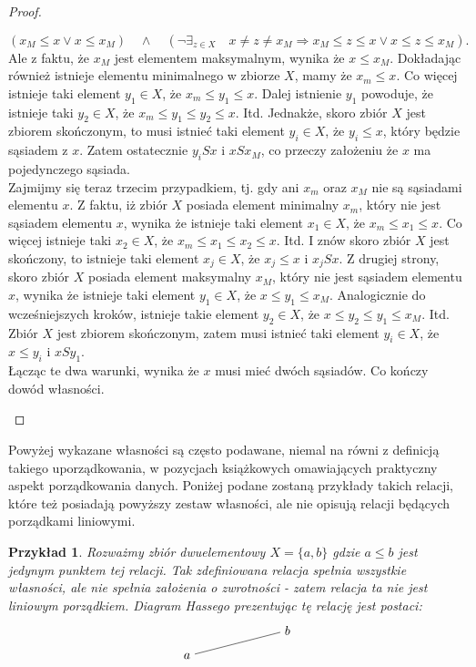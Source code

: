 \documentclass[12pt,a4paper]{report}
\newtheorem{example}{Przykład}
\begin{document}
\begin{proof}
\begin{enumerate}
\begin{itemize}
$$
\left(x_M \leq x \lor x \leq x_M\right) \quad \land \quad \left(\lnot \exists_{z \in X}  \quad x\neq z \neq x_M \Rightarrow   x_M \leq z \leq x \lor x \leq z \leq x_M \right). 
$$
Ale z faktu, że $x_M$ jest elementem maksymalnym, wynika że $x \leq x_M$. Dokładając również istnieje elementu minimalnego w zbiorze $X$, mamy że $x_m \leq x$. Co więcej istnieje taki element $y_1 \in X$, że $x_m \leq y_1 \leq x$. Dalej istnienie $y_1$ powoduje, że istnieje taki $y_2 \in X$, że $x_m \leq y_1 \leq y_2 \leq x$. Itd.  Jednakże, skoro zbiór $X$ jest zbiorem skończonym, to musi istnieć taki element $y_i \in X$, że $y_i \leq x$, który będzie sąsiadem z $x$. Zatem ostatecznie $y_iSx$ i $xSx_M$, co przeczy założeniu że $x$ ma pojedynczego sąsiada.\\
\newline
Zajmijmy się teraz trzecim przypadkiem, tj. gdy ani $x_m$ oraz $x_M$ nie są sąsiadami elementu $x$. Z faktu, iż zbiór $X$ posiada element minimalny $x_m$, który nie jest sąsiadem elementu $x$, wynika że istnieje taki element $x_1 \in X$, że $x_m \leq x_1 \leq x$. Co więcej istnieje taki $x_2 \in X$, że $x_m \leq x_1 \leq x_2 \leq x.$ Itd. I znów skoro zbiór $X$ jest skończony, to istnieje taki element $x_j \in X$, że $x_j \leq x$ i $x_jSx$. Z drugiej strony, skoro zbiór $X$ posiada element maksymalny $x_M$, który nie jest sąsiadem elementu $x$, wynika że istnieje taki element $y_1 \in X$, że $x \leq y_1 \leq x_M$. Analogicznie do wcześniejszych kroków, istnieje takie element $y_2 \in X$, że $x \leq y_2 \leq y_1 \leq x_M$. Itd.  Zbiór $X$ jest zbiorem skończonym, zatem musi istnieć taki element $y_i \in X$, że $x \leq y_i$ i $xSy_1$. \\
Łącząc te dwa warunki, wynika że $x$ musi mieć dwóch sąsiadów. Co kończy dowód własności.

\end{itemize}

\end{enumerate}
\end{proof}

Powyżej wykazane własności są często podawane, niemal na równi z definicją takiego uporządkowania, w pozycjach książkowych omawiających praktyczny aspekt porządkowania danych. Poniżej podane zostaną przykłady takich relacji, które też posiadają powyższy zestaw własności, ale nie opisują relacji będących porządkami liniowymi. 
 
\begin{example}
Rozważmy zbiór dwuelementowy $X = \{ a, b \}$ gdzie $a \leq b$ jest jedynym punktem tej relacji. Tak zdefiniowana relacja spełnia wszystkie własności, ale nie spełnia założenia o zwrotności - zatem relacja ta nie jest liniowym porządkiem. 
\newline Diagram Hassego prezentując tę relację jest postaci: 
$$
\begin{tikzpicture}[scale=.7]
  \node (a) at (-2,0) {$a$};
  \node (b) at (2,1) {$b$};
  \draw (a)--(b) ; %
\end{tikzpicture}
$$
\end{example}
\end{document}
